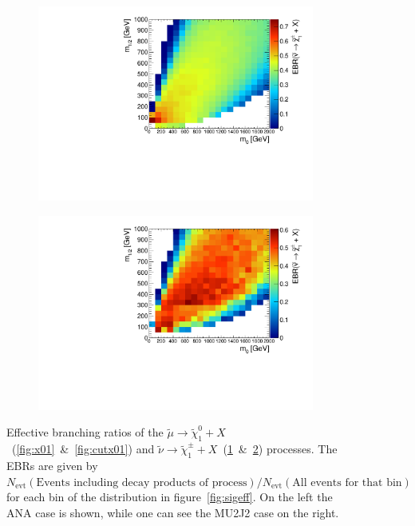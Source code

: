 \begin{figure}[ht!]
  \begin{subfigure}[b]{0.495\textwidth}
    \centering
    \includegraphics[width=\textwidth]{plots/hXplus1NeutRatio.pdf}
    \caption{\label{fig:xplus1neut}}
  \end{subfigure}
  \begin{subfigure}[b]{0.495\textwidth}
    \centering
    \includegraphics[width=\textwidth]{plots/hCutXplus1NeutRatio.pdf}
    \caption{\label{fig:cutxplus1neut}}
  \end{subfigure}
  \caption{Effective branching ratios of the $\tilde{\mu} \rightarrow \tilde{\chi}^0_1 + X$~(\ref{fig:x01}~\&~\ref{fig:cutx01}) and $\tilde{\nu} \rightarrow \tilde{\chi}^\pm_1 + X$~(\ref{fig:xplus1neut}~\&~\ref{fig:cutxplus1neut}) processes. The EBRs are given by $N_{\text{evt}}(\text{Events including decay products of process}) / N_{\text{evt}}(\text{All events for that bin})$ for each bin of the distribution in figure~\ref{fig:sigeff}. On the left the ANA case is shown, while one can see the MU2J2 case on the right.}
  \label{fig:x01sneuxplusratio}
\end{figure}

